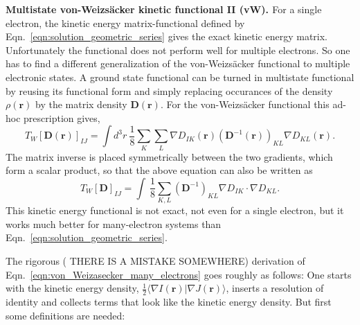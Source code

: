 \documentclass[journal=jacsat,manuscript=article]{achemso}
\newcommand\m[1]{\mathbf{#1}}
\renewcommand\vec[1]{\mathbf{#1}}
\begin{document}
\textbf{Multistate von-Weizs\"{a}cker kinetic functional II (vW). \label{sec:vWII}}
For a single electron, the kinetic energy matrix-functional defined by Eqn.~\ref{eqn:solution_geometric_series} gives the exact kinetic energy matrix.
Unfortunately the functional does not perform well for multiple electrons.
So one has to find a different generalization of the von-Weizs\"{a}cker functional to multiple electronic states. A ground state functional can be turned in multistate functional by reusing its functional form and simply replacing occurances of the density $\rho(\vec{r})$ by the matrix density $\m{D}(\vec{r})$.
For the von-Weizs\"{a}cker functional this ad-hoc prescription gives,
\begin{equation}
T_W[\m{D}(\vec{r})]_{IJ} = \int d^3\!r ~ \frac{1}{8} \sum_{K} \sum_{L} \nabla D_{IK}(\vec{r}) \left(\m{D}^{-1}(\vec{r}) \right)_{KL} \nabla D_{KL}(\vec{r}) . \label{eqn:von_Weizasecker_many_electrons}
\end{equation}
The matrix inverse is placed symmetrically between the two gradients, which form a scalar product, so that the above equation can also be written as
\begin{equation}
  T_W[\m{D}]_{IJ} = \int~  \frac{1}{8} \sum_{K,L} \left(\m{D}^{-1}\right)_{KL} \nabla D_{IK} \cdot \nabla D_{KL}.
\end{equation}
This kinetic energy functional is not exact, not even for a single electron, but it works much better for many-electron systems than Eqn.~\ref{eqn:solution_geometric_series}.

The rigorous ({\color{red} THERE IS A MISTAKE SOMEWHERE}) derivation of Eqn.~\ref{eqn:von_Weizasecker_many_electrons} goes roughly as follows: One starts with the kinetic energy density, $\frac{1}{2} \langle \nabla I(\vec{r}) \vert \nabla J(\vec{r}) \rangle$, inserts a resolution of identity and collects terms that look like the kinetic energy density. But first some definitions are needed:
\end{document}
